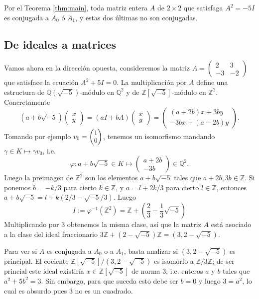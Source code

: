 \documentclass[11pt,a4paper]{amsart}
\newcommand{\Q}{\mathbb{Q}}
\newcommand{\Z}{\mathbb{Z}}
\numberwithin{equation}{section}
\theoremstyle{plain}
\begin{document}
Por el Teorema \ref{thm:main}, toda matriz entera $A$
de $2 \times 2$ que satisfaga $A^2 = -5 I$ es conjugada a $A_0$ ó $A_1$,
y estas dos últimas no son conjugadas.

\subsection{De ideales a matrices}

Vamos ahora en la dirección opuesta, consideremos la matriz
$A = \begin{pmatrix}2 & 3 \\ -3 & -2 \end{pmatrix}$ que
satisface la ecuación $A^2 + 5 I = 0$. La multiplicación
por $A$ define una estructura de $\Q(\sqrt{-5})$-módulo
en $\Q^2$ y de $\Z[\sqrt{-5}]$-módulo en $\Z^2$. Concretamente
\[
(a+b\sqrt{-5})\begin{pmatrix}x\\ y\end{pmatrix}
= (aI+bA)\begin{pmatrix}x\\ y\end{pmatrix}
= \begin{pmatrix}(a+2b)x+3by\\-3bx + (a-2b)y\end{pmatrix}.
\]
Tomando por ejemplo $v_0 =\small\begin{pmatrix} 1 \\ 0\end{pmatrix}$,
tenemos un isomorfismo mandando $\gamma \in K \mapsto \gamma v_0$, i.e.
\[
\varphi \colon
a+b\sqrt{-5} \in K \longmapsto \begin{pmatrix}a+2b\\-3b\end{pmatrix} \in \Q^2.
\]
Luego la preimagen de $\Z^2$ son los elementos $a+b\sqrt{-5}$
tales que $a+2b, 3b \in \Z$. Si ponemos $b = -k/3$ para cierto $k \in \Z$,
y $a = l+2k/3$ para cierto $l \in \Z$, entonces $a+b\sqrt{-5}
= l + k(2/3-\sqrt{-5}/3)$. Luego
\[
I := \varphi^{-1}(\Z^2) =
\Z + \left(\frac{2}{3}-\frac{1}{3}\sqrt{-5}\right)
\]
Multiplicando por $3$ obtenemos la misma clase, así que la matriz $A$
está asociado a la clase del ideal fraccionario $3\Z+(2-\sqrt{-5})\Z
= (3,2-\sqrt{-5})$.

Para ver si $A$ es conjugada a $A_0$ o a $A_1$,
basta analizar si $(3,2-\sqrt{-5})$ es principal. El cociente
$\Z[\sqrt{-5}]/(3,2-\sqrt{-5})$ es isomorfo a $\Z/3\Z$; de ser
princial este ideal existiría $x \in \Z[\sqrt{-5}]$ de norma $3$;
i.e. enteros $a$ y $b$ tales que $a^2+5b^2 = 3$. Sin embargo,
para que suceda esto debe ser $b = 0$ y luego $3 = a^2$, lo cual
es absurdo pues $3$ no es un cuadrado.
\end{document}
